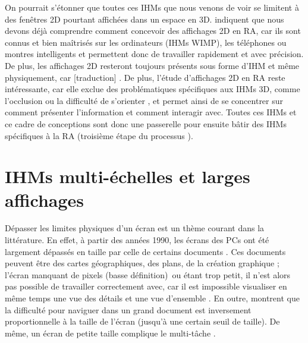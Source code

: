 
On pourrait s'étonner que toutes ces IHMs que nous venons de voir se limitent à des fenêtres 2D pourtant affichées dans un espace en 3D. \cite{Ens2014a} indiquent que nous devons déjà comprendre comment concevoir des affichages 2D en RA, car ils sont connus et bien maîtrisés sur les ordinateurs (IHMs WIMP), les téléphones ou montres intelligents et permettent donc de travailler rapidement et avec précision. De plus, les affichages 2D resteront toujours présents sous forme d'IHM et même physiquement, car [traduction]  \citep[p. 1]{Ens2014a}. De plus, l'étude d'affichages 2D en RA reste intéressante, car elle exclue des problématiques spécifiques aux IHMs 3D, comme l'occlusion ou la difficulté de s'orienter \citep{Berge2014}, et permet ainsi de se concentrer sur comment présenter l'information et comment interagir avec. Toutes ces IHMs et ce cadre de conceptions sont donc une passerelle pour ensuite bâtir des IHMs spécifiques à la RA (troisième étape du processus \cite{Billinghurst2005}).


\section{IHMs multi-échelles et larges affichages}
\label{sec:litterature_multiscale_displays}


Dépasser les limites physiques d'un écran est un thème courant dans la littérature. En effet, à partir des années 1990, les écrans des PCs ont été largement dépassés en taille par celle de certains documents \citep{Guiard2004}. Ces documents peuvent être des cartes géographiques, des plans, de la création graphique ; l'écran manquant de pixels (basse définition)\footnotemark\ ou étant trop petit, il n'est alors pas possible de travailler correctement avec, car il est impossible visualiser en même temps une vue des détails et une vue d'ensemble . En outre, \cite{Guiard2004} montrent que la difficulté pour naviguer dans un grand document est inversement proportionnelle à la taille de l'écran (jusqu'à une certain seuil de taille). De même, un écran de petite taille complique le multi-tâche \citep{Ens2014}.

